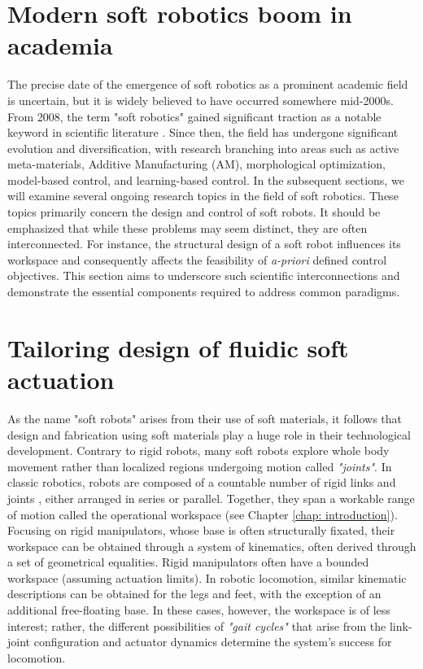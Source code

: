\section{Modern soft robotics boom in academia}
The precise date of the emergence of soft robotics as a prominent academic field is uncertain, but it is widely believed to have occurred somewhere mid-2000s. From 2008, the term "soft robotics" gained significant traction as a notable keyword in scientific literature \cite{Bao2018Jun}. Since then, the field has undergone significant evolution and diversification, with research branching into areas such as active meta-materials, Additive Manufacturing (AM), morphological optimization, model-based control, and learning-based control. In the subsequent sections, we will examine several ongoing research topics in the field of soft robotics. These topics primarily concern the design and control of soft robots. It should be emphasized that while these problems may seem distinct, they are often interconnected. For instance, the structural design of a soft robot influences its workspace and consequently affects the feasibility of \textit{a-priori} defined control objectives. This section aims to underscore such scientific interconnections and demonstrate the essential components required to address common paradigms. \vspace{-2mm}
%
\section{Tailoring design of fluidic soft actuation}
\label{sec:C2:conventional_actuation}
As the name "soft robots" arises from their use of soft materials, it follows that design and fabrication using soft materials play a huge role in their technological development. Contrary to rigid robots, many soft robots explore whole body movement rather than localized regions undergoing motion called \textit{"joints"}. In classic robotics, robots are composed of a countable number of rigid links and joints \cite{Spong2006, Murray1994, Corke2011}, either arranged in series or parallel. Together, they span a workable range of motion called the operational workspace \cite{Spong2006} (see Chapter \ref{chap: introduction}). Focusing on rigid manipulators, whose base is often structurally fixated, their workspace can be obtained through a system of kinematics, often derived through a set of geometrical equalities. Rigid manipulators often have a bounded workspace (assuming actuation limits). In robotic locomotion, similar kinematic descriptions can be obtained for the legs and feet, with the exception of an additional free-floating base. In these cases, however, the workspace is of less interest; rather, the different possibilities of \textit{"gait cycles"} that arise from the link-joint configuration and actuator dynamics determine the system's success for locomotion.

